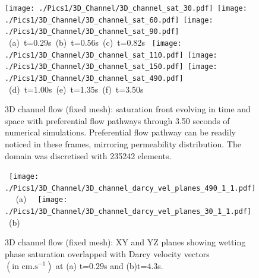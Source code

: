 \begin{landscape}
\begin{figure}[ht]
  \vbox{\vspace{-.5cm}
      \hbox{\texttt{[image: ./Pics1/3D\_Channel/3D\_channel\_sat\_30.pdf]} 
            \texttt{[image: ./Pics1/3D\_Channel/3D\_channel\_sat\_60.pdf]}
            \texttt{[image: ./Pics1/3D\_Channel/3D\_channel\_sat\_90.pdf]} } 
      \hbox{\hspace{2.cm} (a) t=0.29s \hspace{5.cm} (b) t=0.56s \hspace{4.cm} (c) t=0.82s}
      \vspace{0.5cm}
      \hbox{\hspace{.5cm} 
            \texttt{[image: ./Pics1/3D\_Channel/3D\_channel\_sat\_110.pdf]}
            \texttt{[image: ./Pics1/3D\_Channel/3D\_channel\_sat\_150.pdf]}
            \texttt{[image: ./Pics1/3D\_Channel/3D\_channel\_sat\_490.pdf]} }
      \hbox{\hspace{2.cm} (d) t=1.00s \hspace{5.cm} (e) t=1.35s\hspace{4.cm} (f) t=3.50s  } }
\caption{3D channel flow (fixed mesh): saturation front evolving in time and space with preferential flow pathways through 3.50 seconds of numerical simulations. Preferential flow pathway can be readily noticed in these frames, mirroring permeability distribution. The domain was discretised with 235242  elements.}
\label{fig:3DChannel_sat}
\end{figure}
\end{landscape}
\clearpage


\begin{figure}[ht] 
\vbox{
\hbox{\hspace{0.5cm}
\texttt{[image: ./Pics1/3D\_Channel/3D\_channel\_darcy\_vel\_planes\_490\_1\_1.pdf]} 
}
\vspace{-12.0cm}
\hbox{\hspace{6.0cm} (a)     
}
\hbox{\hspace{0.5cm}
\texttt{[image: ./Pics1/3D\_Channel/3D\_channel\_darcy\_vel\_planes\_30\_1\_1.pdf]}
}
\vspace{-12.0cm}
\hbox{\hspace{6.0cm} (b)      
}
}     
\caption{3D channel flow (fixed mesh): XY and YZ planes showing wetting phase saturation overlapped with Darcy velocity vectors $\left(\text{in cm.s}^{-1}\right)$  at (a) t=$0.29$s and (b)t=$4.3$s.}
\label{fig:3DChannel_planes}
\end{figure}
\clearpage



